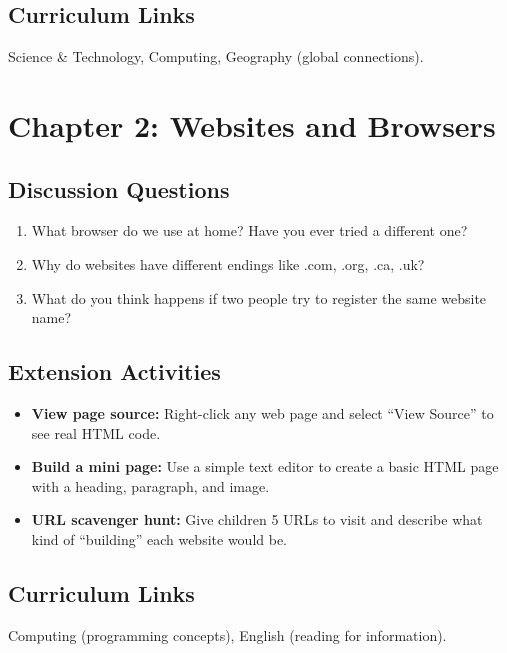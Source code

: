 \subsection*{Curriculum Links}
Science \& Technology, Computing, Geography (global connections).

\sectionrule

\section*{Chapter 2: Websites and Browsers}

\subsection*{Discussion Questions}
\begin{enumerate}
  \item What browser do we use at home? Have you ever tried a different one?
  \item Why do websites have different endings like .com, .org, .ca, .uk?
  \item What do you think happens if two people try to register the same website name?
\end{enumerate}

\subsection*{Extension Activities}
\begin{itemize}
  \item \textbf{View page source:} Right-click any web page and select ``View Source'' to see real HTML code.
  \item \textbf{Build a mini page:} Use a simple text editor to create a basic HTML page with a heading, paragraph, and image.
  \item \textbf{URL scavenger hunt:} Give children 5 URLs to visit and describe what kind of ``building'' each website would be.
\end{itemize}

\subsection*{Curriculum Links}
Computing (programming concepts), English (reading for information).

\sectionrule

